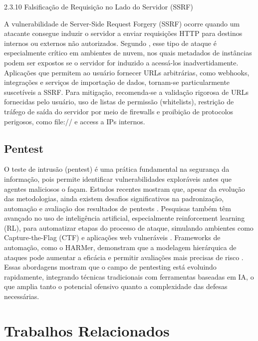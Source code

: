 \documentclass[12pt]{article}
\begin{document}
2.3.10 Falsificação de Requisição no Lado do Servidor (SSRF)

A vulnerabilidade de Server-Side Request Forgery (SSRF) ocorre quando um atacante consegue induzir o servidor a enviar requisições HTTP para destinos internos ou externos não autorizados.
 Segundo \textcite{owasp10}, esse tipo de ataque é especialmente crítico em ambientes de nuvem, nos quais metadados de instâncias podem ser expostos se o servidor for induzido a acessá-los 
 inadvertidamente. Aplicações que permitem ao usuário fornecer URLs arbitrárias, como webhooks, integrações e serviços de importação de dados,  tornam-se particularmente suscetíveis a SSRF.
 Para mitigação, recomenda-se a validação rigorosa de URLs fornecidas pelo usuário, uso de listas de permissão (whitelists), restrição de tráfego de saída do servidor por meio de firewalls 
 e proibição de protocolos perigosos, como file:// e access a IPs internos.

\subsection{Pentest}

O teste de intrusão (pentest) é uma prática fundamental na segurança da informação, 
pois permite identificar vulnerabilidades exploráveis antes que agentes maliciosos o façam. 
Estudos recentes mostram que, apesar da evolução das metodologias, ainda existem desafios significativos na padronização, 
automação e avaliação dos resultados de pentests \cite{Bertoglio2017}. Pesquisas também têm avançado no uso de inteligência artificial, 
especialmente reinforcement learning (RL), para automatizar etapas do processo de ataque, simulando ambientes como Capture-the-Flag (CTF) 
e aplicações web vulneráveis \cite{Zennaro2023}. Frameworks de automação, como o HARMer, demonstram que a modelagem hierárquica de ataques 
pode aumentar a eficácia e permitir avaliações mais precisas de risco \cite{Enoch2020}. Essas abordagens mostram que o campo de pentesting 
está evoluindo rapidamente, integrando técnicas tradicionais com ferramentas baseadas em IA, o que amplia tanto o potencial ofensivo quanto
a complexidade das defesas necessárias.


\section{Trabalhos Relacionados}
\end{document}
